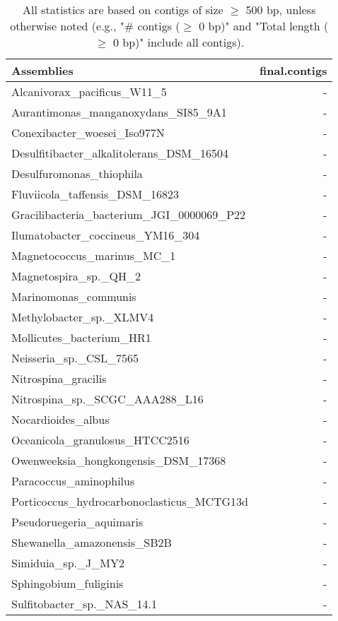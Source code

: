 \documentclass[12pt,a4paper]{article}
\begin{document}
\begin{table}[ht]
\begin{center}
\caption{All statistics are based on contigs of size $\geq$ 500 bp, unless otherwise noted (e.g., "\# contigs ($\geq$ 0 bp)" and "Total length ($\geq$ 0 bp)" include all contigs).}
\begin{tabular}{|l*{1}{|r}|}
\hline
Assemblies & final.contigs \\ \hline
Alcanivorax\_pacificus\_W11\_5 & - \\ \hline
Aurantimonas\_manganoxydans\_SI85\_9A1 & - \\ \hline
Conexibacter\_woesei\_Iso977N & - \\ \hline
Desulfitibacter\_alkalitolerans\_DSM\_16504 & - \\ \hline
Desulfuromonas\_thiophila & - \\ \hline
Fluviicola\_taffensis\_DSM\_16823 & - \\ \hline
Gracilibacteria\_bacterium\_JGI\_0000069\_P22 & - \\ \hline
Ilumatobacter\_coccineus\_YM16\_304 & - \\ \hline
Magnetococcus\_marinus\_MC\_1 & - \\ \hline
Magnetospira\_sp.\_QH\_2 & - \\ \hline
Marinomonas\_communis & - \\ \hline
Methylobacter\_sp.\_XLMV4 & - \\ \hline
Mollicutes\_bacterium\_HR1 & - \\ \hline
Neisseria\_sp.\_CSL\_7565 & - \\ \hline
Nitrospina\_gracilis & - \\ \hline
Nitrospina\_sp.\_SCGC\_AAA288\_L16 & - \\ \hline
Nocardioides\_albus & - \\ \hline
Oceanicola\_granulosus\_HTCC2516 & - \\ \hline
Owenweeksia\_hongkongensis\_DSM\_17368 & - \\ \hline
Paracoccus\_aminophilus & - \\ \hline
Porticoccus\_hydrocarbonoclasticus\_MCTG13d & - \\ \hline
Pseudoruegeria\_aquimaris & - \\ \hline
Shewanella\_amazonensis\_SB2B & - \\ \hline
Simiduia\_sp.\_J\_MY2 & - \\ \hline
Sphingobium\_fuliginis & - \\ \hline
Sulfitobacter\_sp.\_NAS\_14.1 & - \\ \hline

\end{tabular}
\end{center}
\end{table}
\end{document}
